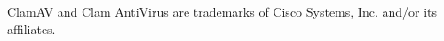 \documentclass[a4paper,titlepage,english]{book}
\begin{document}
\vspace{0.3cm}
\noindent
\begin{boxedminipage}[b]{\textwidth}
    ClamAV and Clam AntiVirus are trademarks of Cisco Systems, Inc. and/or its affiliates.
\end{boxedminipage}
\setlength{\parindent}{18pt}
\mainmatter











\backmatter

\end{document}
